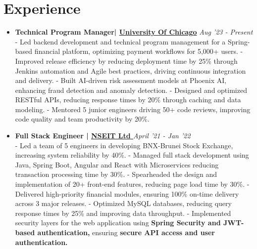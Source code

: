 \documentclass[a4paper,11pt]{extarticle} %
\begin{document}
\vspace{+0.2cm}
\section{\textcolor{primary}{Experience}}
\vspace{+0.1cm}

\begin{itemize}[leftmargin=0.55cm, rightmargin=0.2cm, label={\Large\textbullet}]

\item \textbf{Technical Program Manager| \href{}{University Of Chicago}} \hfill{\textit{Aug '23 - Present}} \\
- Led backend development and technical program management for a Spring-based financial platform, optimizing payment workflows for 5,000+ users.\newline
- Improved release efficiency by reducing deployment time by 25\% through Jenkins automation and Agile best practices, driving continuous integration and delivery.
\newline
- Built AI-driven risk assessment models at Phoenix AI, enhancing fraud detection and anomaly detection.
 \newline
- Designed and optimized RESTful APIs, reducing response times by 20\% through caching and  data modeling.\newline
- Mentored 5 junior engineers driving  50+ code reviews, improving code quality  and  team productivity by 20\%.

\item \textbf{Full Stack Engineer | \href{}{\textbf{NSEIT Ltd}
}} \hfill{\textit{April '21 - Jan '22}} \\
- Led a team of 5 engineers in developing BNX-Brunei Stock Exchange, increasing system reliability by 40\%.\newline
- Managed full stack development using Java, Spring Boot, Angular and React with Microservices reducing \newline transaction processing time by 30\%.\newline
- Spearheaded the design and implementation of 20+ front-end features, reducing page load time by 30\%.\newline
- Delivered high-priority financial modules, ensuring 100\% on-time delivery across 3 major releases.\newline
- Optimized MySQL databases, reducing query response times by 25\% and improving data throughput.\newline
- Implemented security layers for the web application using \textbf{Spring Security and JWT-based authentication,} ensuring \textbf{secure API access and user authentication.}



\end{itemize}
\end{document}
